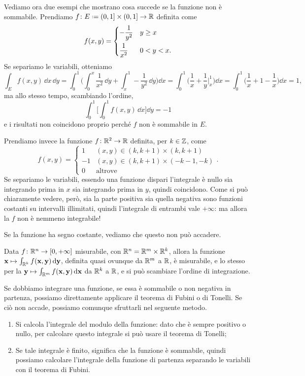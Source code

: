 Vediamo ora due esempi che mostrano cosa succede se la funzione non è sommabile.
Prendiamo $f\colon E\defeq(0,1]\times(0,1]\to\R$ definita come
\begin{equation*}
	f(x,y)=
	\begin{dcases}
		-\frac1{y^2} &y\geq x\\
		\frac1{x^2} &0<y<x.
	\end{dcases}
\end{equation*}
Se separiamo le variabili, otteniamo
\begin{equation}
	\int_Ef(x,y)\,\dd x\,\dd y=\int_0^1\bigg(\int_0^x\frac1{x^2}\,\dd y+\int_x^1-\frac1{y^2}\,\dd y\bigg)\dd x=\int_0^1\bigg(\frac1{x}+\frac1{y}\bigg|_x^1\bigg)\dd x=\int_0^1\bigg(\frac1{x}+1-\frac1{x}\bigg)\dd x=1,
\end{equation}
ma allo stesso tempo, scambiando l'ordine,
\begin{equation}
	\int_0^1\bigg[\int_0^1f(x,y)\,\dd x\bigg]\dd y=-1
\end{equation}
e i risultati non coincidono proprio perch\'e $f$ non è sommabile in $E$.

Prendiamo invece la funzione $f\colon\mathbb{R}^2\to\mathbb{R}$ definita, per $k\in\mathbb{Z}$, come
\begin{equation*}
	f(x,y)=
	\begin{cases}
		1 &(x,y)\in(k,k+1)\times(k,k+1)\\
		-1 &(x,y)\in(k,k+1)\times(-k-1,-k)\\
		0 &\text{altrove}
	\end{cases}.
\end{equation*}
Se separiamo le variabili, essendo una funzione dispari l'integrale è nullo sia integrando prima in $x$ sia integrando prima in $y$, quindi coincidono.
Come si può chiaramente vedere, però, sia la parte positiva sia quella negativa sono funzioni costanti su intervalli illimitati, quindi l'integrale di entrambi vale $+\infty$: ma allora la $f$ non è nemmeno integrabile!

Se la funzione ha segno costante, vediamo che questo non può accadere.
\begin{teorema}[di Tonelli] \label{t:tonelli}
	Data $f\colon\mathbb{R}^n\to[0,+\infty]$ misurabile, con $\mathbb{R}^n=\mathbb{R}^m\times\mathbb{R}^k$, allora la funzione $\mathbf{x}\mapsto\int_{\mathbb{R}^k}f(\mathbf{x},\mathbf{y})\,\textup{d}\mathbf{y}$, definita quasi ovunque da $\mathbb{R}^m$ a $\mathbb{R}$, è misurabile, e lo stesso per la $\mathbf{y}\mapsto\int_{\mathbb{R}^m}f(\mathbf{x},\mathbf{y})\,\textup{d}\mathbf{x}$ da $\mathbb{R}^k$ a $\mathbb{R}$, e si può scambiare l'ordine di integrazione.
\end{teorema}
Se dobbiamo integrare una funzione, se essa è sommabile o non negativa in partenza, possiamo direttamente applicare il teorema di Fubini o di Tonelli.
Se ciò non accade, possiamo comunque sfruttarli nel seguente metodo.
\begin{enumerate}
	\item Si calcola l'integrale del modulo della funzione: dato che è sempre positivo o nullo, per calcolare questo integrale si può usare il teorema di Tonelli;
	\item Se tale integrale è finito, significa che la funzione è sommabile, quindi possiamo calcolare l'integrale della funzione di partenza separando le variabili con il teorema di Fubini.
\end{enumerate}

